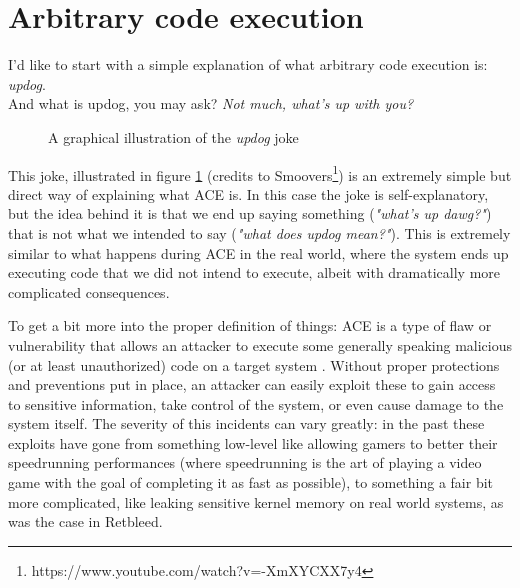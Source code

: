\documentclass[a4paper]{usiinfbachelorproject}
\begin{document}
\section{Arbitrary code execution}
\label{sec:ace}
I'd like to start with a simple explanation of what arbitrary code execution is: \textit{updog}. \\ And what is updog, you may ask? \textit{Not much, what's up with you?}

\begin{figure}[h!]
	\caption{A graphical illustration of the \textit{updog} joke\label{fig:updog}}
\end{figure}

This joke, illustrated in figure \ref{fig:updog} (credits to Smoovers\footnote{https://www.youtube.com/watch?v=-XmXYCXX7y4}) is an extremely simple but direct way of explaining what ACE is. In this case the joke is self-explanatory, but the idea behind it is that we end up saying something (\textit{"what's up dawg?"}) that is not what we intended to say (\textit{"what does updog mean?"}). This is extremely similar to what happens during ACE in the real world, where the system ends up executing code that we did not intend to execute, albeit with dramatically more complicated consequences.

To get a bit more into the proper definition of things: ACE is a type of flaw or vulnerability that allows an attacker to execute some generally speaking malicious (or at least unauthorized) code on a target system \cite{websrc3}. Without proper protections and preventions put in place, an attacker can easily exploit these to gain access to sensitive information, take control of the system, or even cause damage to the system itself. The severity of this incidents can vary greatly: in the past these exploits have gone from something low-level like allowing gamers to better their speedrunning performances\cite{smw-speedrun} (where speedrunning is the art of playing a video game with the goal of completing it as fast as possible), to something a fair bit more complicated, like leaking sensitive kernel memory on real world systems, as was the case in Retbleed\cite{websrc6}.
\end{document}
